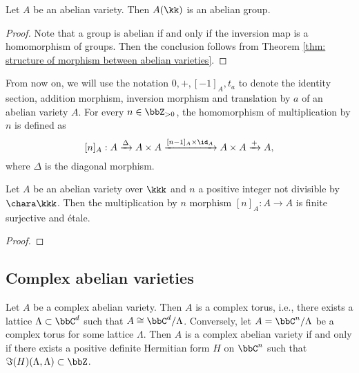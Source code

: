     \begin{proposition}\label{prop: abelian varieties are abelian groups}
        Let \( A \) be an abelian variety. 
        Then \( A(\kk) \) is an abelian group.
    \end{proposition}
    \begin{proof}
        Note that a group is abelian if and only if the inversion map is a homomorphism of groups.
        Then the conclusion follows from Theorem \ref{thm: structure of morphism between abelian varieties}.
    \end{proof}

    From now on, we will use the notation \(0, +, [-1]_A, t_a\) to denote the identity section, addition morphism, inversion morphism and translation by \(a\) of an abelian variety \(A\).
    For every \(n \in \bbZ_{>0}\), the homomorphism of multiplication by \(n\) is defined as 
    \[ [n]_A: A \xrightarrow{\Delta} A \times A \xrightarrow{[n-1]_A\times \id_A} A \times A \xrightarrow{+} A, \]
    where \(\Delta\) is the diagonal morphism.

    \begin{proposition}\label{prop:multiplication_by_n_is_etale_when_n_is_not_divisible_by_char}
        Let \(A\) be an abelian variety over \(\kkk\) and \(n\) a positive integer not divisible by \(\chara \kkk\).
        Then the multiplication by \(n\) morphism \([n]_A: A \to A\) is finite surjective and \'etale.
    \end{proposition}
    \begin{proof}
    \end{proof}

\subsection{Complex abelian varieties}

    \begin{theorem}\label{thm: complex abelian varieties are complex tori}
        Let \(A\) be a complex abelian variety.
        Then \(A\) is a complex torus, i.e., there exists a lattice \(\Lambda \subset \bbC^d\) such that \(A \cong \bbC^d / \Lambda\).
        Conversely, let \(A = \bbC^n/\Lambda\) be a complex torus for some lattice \(\Lambda\).
        Then \(A\) is a complex abelian variety if and only if there exists a positive definite Hermitian form \(H\) on \(\bbC^n\) such that \(\Im(H)(\Lambda, \Lambda) \subset \bbZ\).
    \end{theorem}


